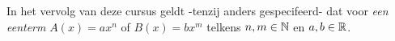 \documentclass{ximera}
\begin{document}















\begin{notation}

	In het vervolg van deze cursus geldt -tenzij anders gespecifeerd- dat voor \textit{ een eenterm} $A(x) = ax^n$ of $B(x) = bx^m$ telkens $n,m\in \mathbb{N}$ en $a,b\in \mathbb{R}$.
\end{notation}
	
\end{document}

